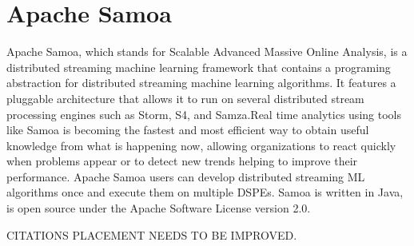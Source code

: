 \section{Apache Samoa}
Apache Samoa, which stands for Scalable Advanced Massive Online Analysis, is a
distributed streaming machine learning framework that contains a programing
abstraction for distributed streaming machine learning algorithms.
\cite{samoa-web} It features a pluggable architecture that allows it to run on
several distributed stream processing engines such as Storm, S4, and Samza.Real
time analytics using tools like Samoa is becoming the fastest and most efficient
way to obtain useful knowledge from what is happening now, allowing
organizations to react quickly when problems appear or to detect new trends
helping to improve their performance. \cite{samoa-MUSE} Apache Samoa users can
develop distributed streaming ML algorithms once and execute them on multiple
DSPEs. Samoa is written in Java, is open source under the Apache Software
License version 2.0.\cite{ samoa-JMLR}

CITATIONS PLACEMENT NEEDS TO BE IMPROVED.
